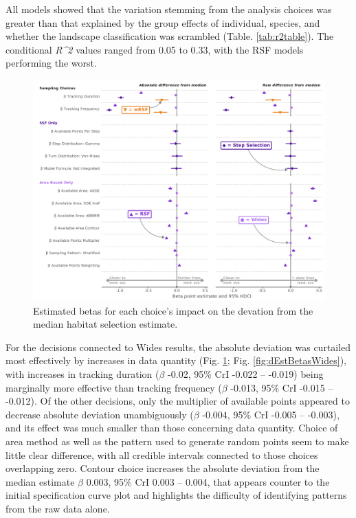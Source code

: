 \documentclass[10pt,a4paper]{article}
\begin{document}
All models showed that the variation stemming from the analysis choices was greater than that explained by the group effects of individual, species, and whether the landscape classification was scrambled (Table. \ref{tab:r2table}).
The conditional \emph{R\^{}2} values ranged from 0.05 to 0.33, with the RSF models performing the worst.

\begin{figure}
\includegraphics[width=1\linewidth]{../figures/_allEffectsPlot} \caption{Estimated betas for each choice's impact on the devation from the median habitat selection estimate.}\label{fig:brmsAllEffectsPlot}
\end{figure}

For the decisions connected to Wides results, the absolute deviation was curtailed most effectively by increases in data quantity (Fig. \ref{fig:brmsAllEffectsPlot}; Fig. \ref{fig:dEstBetasWides}), with increases in tracking duration (\(\beta\) -0.02, 95\% CrI -0.022 -- -0.019) being marginally more effective than tracking frequency (\(\beta\) -0.013, 95\% CrI -0.015 -- -0.012).
Of the other decisions, only the multiplier of available points appeared to decrease absolute deviation unambiguously (\(\beta\) -0.004, 95\% CrI -0.005 -- -0.003), and its effect was much smaller than those concerning data quantity.
Choice of area method as well as the pattern used to generate random points seem to make little clear difference, with all credible intervals connected to those choices overlapping zero.
Contour choice increases the absolute deviation from the median estimate \(\beta\) 0.003, 95\% CrI 0.003 -- 0.004, that appears counter to the initial specification curve plot and highlights the difficulty of identifying patterns from the raw data alone.
\end{document}

